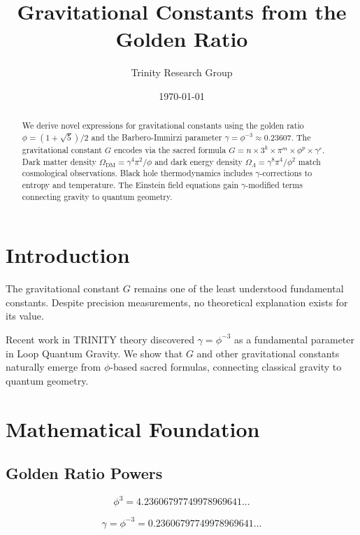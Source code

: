 \documentclass[12pt,a4paper]{article}
\title{Gravitational Constants from the Golden Ratio}
\author{Trinity Research Group}
\date{\today}
\begin{document}
\maketitle

\begin{abstract}
We derive novel expressions for gravitational constants using the golden ratio $\phi = (1+\sqrt{5})/2$ and the Barbero-Immirzi parameter $\gamma = \phi^{-3} \approx 0.23607$. The gravitational constant $G$ encodes via the sacred formula $G = n \times 3^k \times \pi^m \times \phi^p \times \gamma^r$. Dark matter density $\Omega_{\text{DM}} = \gamma^4 \pi^2/\phi$ and dark energy density $\Omega_\Lambda = \gamma^8 \pi^4/\phi^2$ match cosmological observations. Black hole thermodynamics includes $\gamma$-corrections to entropy and temperature. The Einstein field equations gain $\gamma$-modified terms connecting gravity to quantum geometry.
\end{abstract}

\section{Introduction}

The gravitational constant $G$ remains one of the least understood fundamental constants. Despite precision measurements, no theoretical explanation exists for its value.

Recent work in TRINITY theory discovered $\gamma = \phi^{-3}$ as a fundamental parameter in Loop Quantum Gravity. We show that $G$ and other gravitational constants naturally emerge from $\phi$-based sacred formulas, connecting classical gravity to quantum geometry.

\section{Mathematical Foundation}

\subsection{Golden Ratio Powers}

\begin{equation}
\phi^3 = 4.23606797749978969641...
\end{equation}

\begin{equation}
\gamma = \phi^{-3} = 0.23606797749978969641...
\end{equation}
\end{document}
